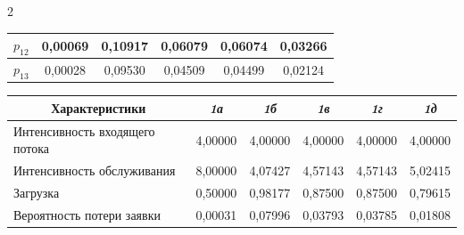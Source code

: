 \begin{multicols}{2}
\begin{table}
\begin{center}
\begin{tabular}{|l|c|c|c|c|c|}
\hline


\hspace*{10mm}$p_{12}$      & 0,00069 & 0,10917 & 0,06079 & 0,06074 & 0,03266\\


\hline


\hspace*{10mm}$p_{13}$      & 0,00028 & 0,09530 & 0,04509 & 0,04499 & 0,02124\\


\hline


\end{tabular}


\end{center}






\begin{center}




\vspace*{2ex}





\begin{tabular}{|l|c|c|c|c|c|}


\hline \multicolumn{1}{|c|}{Характеристики}   & \textit{1а} & \textit{1б}   & 


\textit{1в}   & \textit{1г}


 & \textit{1д}   \\


\hline


Интенсивность входящего потока              & 4,00000 & 4,00000 & 4,00000 & 4,00000 & 4,00000 \\


\hline


Интенсивность обслуживания                  & 8,00000 & 4,07427 & 4,57143 & 4,57143 & 5,02415 \\


\hline


Загрузка                                    & 0,50000 & 0,98177 & 0,87500 & 0,87500 & 0,79615 \\


\hline


Вероятность потери заявки                   & 0,00031 & 0,07996 & 0,03793 & 0,03785 & 0,01808 \\



\end{tabular}
\end{center}
\end{table}
\end{multicols}
